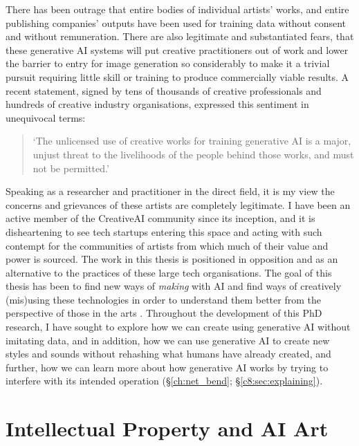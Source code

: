 There has been outrage that entire bodies of individual artists' works, and entire publishing companies' outputs have been used for training data without consent and without remuneration.
There are also legitimate and substantiated fears, that these generative AI systems will put creative practitioners out of work and lower the barrier to entry for image generation so considerably to make it a trivial pursuit requiring little skill or training to produce commercially viable results.
A recent statement, signed by tens of thousands of creative professionals and hundreds of creative industry organisations, expressed this sentiment in unequivocal terms:

\begin{quote}
`The unlicensed use of creative works for training generative AI is a major, unjust threat to the livelihoods of the people behind those works, and must not be permitted.' \citep{aistatement2024}
\end{quote}

Speaking as a researcher and practitioner in the direct field, it is my view the concerns and grievances of these artists are completely legitimate. 
I have been an active member of the CreativeAI community since its inception, and it is disheartening to see tech startups entering this space and acting with such contempt for the communities of artists from which much of their value and power is sourced. 
The work in this thesis is positioned in opposition and as an alternative to the practices of these large tech organisations. 
The goal of this thesis has been to find new ways of \textit{making} with AI and find ways of creatively (mis)using these technologies in order to understand them better from the perspective of those in the arts \citep{salvaggio2023aarg}.
Throughout the development of this PhD research, I have sought to explore how we can create using generative AI without imitating data, and in addition, how we can use generative AI to create new styles and sounds without rehashing what humans have already created, and further, how we can learn more about how generative AI works by trying to interfere with its intended operation (\S \ref{ch:net_bend}; \S \ref{c8:sec:explaining}).

\section{Intellectual Property and AI Art}

